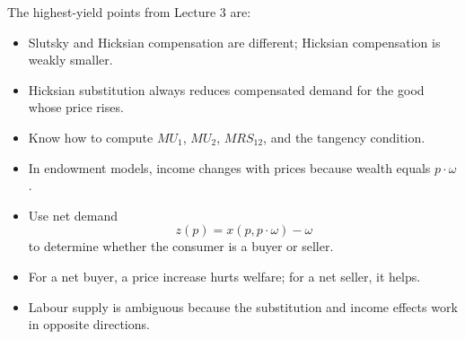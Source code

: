 \begin{examtip}
The highest-yield points from Lecture 3 are:
\begin{itemize}
    \item Slutsky and Hicksian compensation are different; Hicksian compensation is weakly smaller.
    \item Hicksian substitution always reduces compensated demand for the good whose price rises.
    \item Know how to compute $MU_1$, $MU_2$, $MRS_{12}$, and the tangency condition.
    \item In endowment models, income changes with prices because wealth equals $p\cdot \omega$.
    \item Use net demand
    \[
    z(p)=x(p,p\cdot \omega)-\omega
    \]
    to determine whether the consumer is a buyer or seller.
    \item For a net buyer, a price increase hurts welfare; for a net seller, it helps.
    \item Labour supply is ambiguous because the substitution and income effects work in opposite directions.
\end{itemize}
\end{examtip}